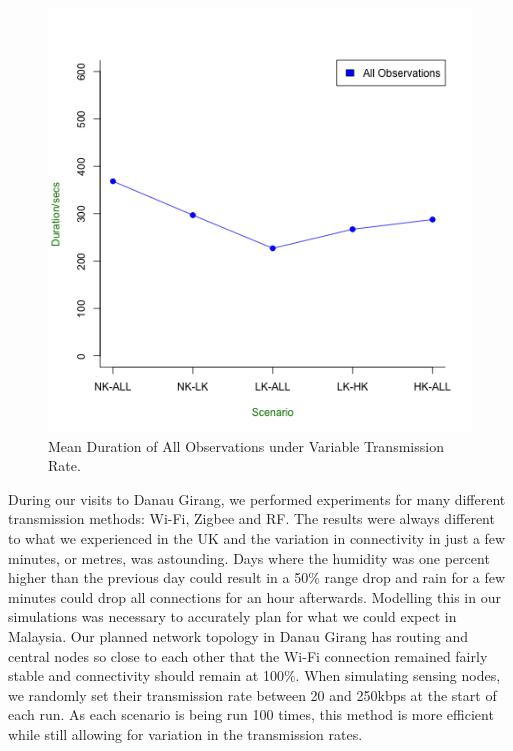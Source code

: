 	\begin{figure}[h]
	\centering
	\includegraphics[width=\textwidth]{Chap7/figures/real_all_dur}
	\caption{Mean Duration of All Observations under Variable Transmission Rate.}
	\label{fig:real:dur}
	\end{figure}	

During our visits to Danau Girang, we performed experiments for many different transmission methods: Wi-Fi, Zigbee and RF. The results were always different to what we experienced in the UK and the variation in connectivity in just a few minutes, or metres, was astounding. Days where the humidity was one percent higher than the previous day could result in a 50\% range drop and rain for a few minutes could drop all connections for an hour afterwards. Modelling this in our simulations was necessary to accurately plan for what we could expect in Malaysia. Our planned network topology in Danau Girang has routing and central nodes so close to each other that the Wi-Fi connection remained fairly stable and connectivity should remain at 100\%. When simulating sensing nodes, we randomly set their transmission rate between 20 and 250kbps at the start of each run. As each scenario is being run 100 times, this method is more efficient while still allowing for variation in the transmission rates. 

